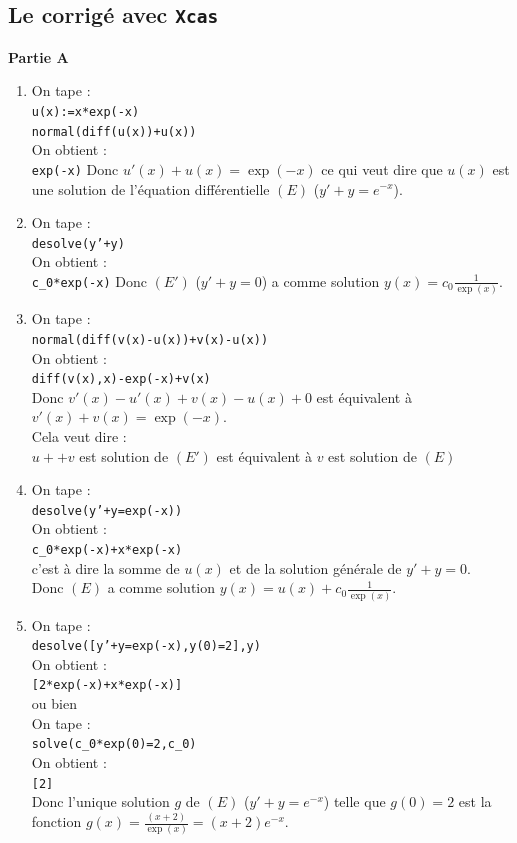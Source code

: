\documentclass[a4paper,11pt]{book}
\begin{document}
\subsection{Le corrig\'e avec {\tt Xcas}}
{\bf Partie A}
\begin{enumerate}
\item On tape :\\
{\tt u(x):=x*exp(-x)}\\
{\tt normal(diff(u(x))+u(x))}\\
On obtient :\\
{\tt exp(-x)}
Donc $u'(x)+u(x)=\exp(-x)$ ce qui veut dire que $u(x)$ est une 
solution de l'\'equation diff\'erentielle $(E)$ ($y'+y=e^{-x}$).

\item On tape :\\
{\tt desolve(y'+y)}\\
On obtient :\\
{\tt c\_0*exp(-x)}
Donc $(E')$ ($y'+y=0$) a comme solution $y(x)=\displaystyle c_0\frac{1}{\exp(x)}$.
\item On tape :\\
{\tt normal(diff(v(x)-u(x))+v(x)-u(x))}\\
On obtient :\\
{\tt diff(v(x),x)-exp(-x)+v(x)}\\
Donc 
$v'(x)-u'(x)+v(x)-u(x)+0$ est \'equivalent \`a $v'(x)+v(x)=\exp(-x)$.\\
Cela veut dire :\\
 $u++v$ est solution de $(E')$  est \'equivalent \`a $v$ est solution de $(E)$ 

\item On tape :\\
{\tt desolve(y'+y=exp(-x))}\\
On obtient :\\
{\tt c\_0*exp(-x)+x*exp(-x)}\\
c'est \`a dire la somme de $u(x)$ et de la solution g\'en\'erale de $y'+y=0$.\\
Donc $(E)$ a comme solution $y(x)=\displaystyle u(x)+c_0\frac{1}{\exp(x)}$.

\item On tape :\\
{\tt desolve([y'+y=exp(-x),y(0)=2],y)}\\
On obtient :\\
{\tt [2*exp(-x)+x*exp(-x)]}\\
ou bien \\
On tape :\\
{\tt solve(c\_0*exp(0)=2,c\_0)}\\
On obtient :\\
{\tt [2]}\\
Donc l'unique solution $g$ de $(E)$ ($y'+y=e^{-x}$)
 telle que $g(0)=2$ est la fonction  
$g(x)=\displaystyle\frac{(x+2)}{\exp(x)}=(x+2)e^{-x}$.
\end{enumerate}
\end{document}

